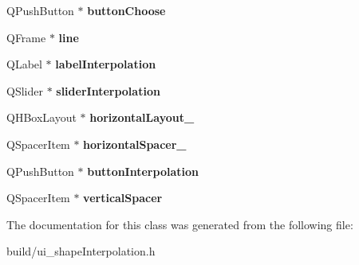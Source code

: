 \begin{DoxyCompactItemize}
\item 
\hypertarget{class_ui___shape_interpolation_widget_ab6ec32b97a2f92a9f83aeba69845fea2}{}Q\+Push\+Button $\ast$ {\bfseries button\+Choose}\label{class_ui___shape_interpolation_widget_ab6ec32b97a2f92a9f83aeba69845fea2}

\item 
\hypertarget{class_ui___shape_interpolation_widget_a2a1cd2d9cf9b1dc21dca1bd267562b66}{}Q\+Frame $\ast$ {\bfseries line}\label{class_ui___shape_interpolation_widget_a2a1cd2d9cf9b1dc21dca1bd267562b66}

\item 
\hypertarget{class_ui___shape_interpolation_widget_aa5d888f7035427424a0e2de4ffe0aae2}{}Q\+Label $\ast$ {\bfseries label\+Interpolation}\label{class_ui___shape_interpolation_widget_aa5d888f7035427424a0e2de4ffe0aae2}

\item 
\hypertarget{class_ui___shape_interpolation_widget_afff12e9aaffdee3ca2c3de0c6a51942f}{}Q\+Slider $\ast$ {\bfseries slider\+Interpolation}\label{class_ui___shape_interpolation_widget_afff12e9aaffdee3ca2c3de0c6a51942f}

\item 
\hypertarget{class_ui___shape_interpolation_widget_a237abb3df0de4cc80ff563c59ca11927}{}Q\+H\+Box\+Layout $\ast$ {\bfseries horizontal\+Layout\+\_}\label{class_ui___shape_interpolation_widget_a237abb3df0de4cc80ff563c59ca11927}

\item 
\hypertarget{class_ui___shape_interpolation_widget_a7bcf13ca832399bbea5796422b0385ad}{}Q\+Spacer\+Item $\ast$ {\bfseries horizontal\+Spacer\+\_}\label{class_ui___shape_interpolation_widget_a7bcf13ca832399bbea5796422b0385ad}

\item 
\hypertarget{class_ui___shape_interpolation_widget_a5807439b0f74b897bb7a3f603b080794}{}Q\+Push\+Button $\ast$ {\bfseries button\+Interpolation}\label{class_ui___shape_interpolation_widget_a5807439b0f74b897bb7a3f603b080794}

\item 
\hypertarget{class_ui___shape_interpolation_widget_a9c8b20719e86875873014748a4e9eebc}{}Q\+Spacer\+Item $\ast$ {\bfseries vertical\+Spacer}\label{class_ui___shape_interpolation_widget_a9c8b20719e86875873014748a4e9eebc}

\end{DoxyCompactItemize}


The documentation for this class was generated from the following file\+:\begin{DoxyCompactItemize}
\item 
build/ui\+\_\+shape\+Interpolation.\+h\end{DoxyCompactItemize}
